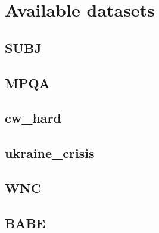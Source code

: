 \section{Available datasets}

\subsection{SUBJ}
\subsection{MPQA}
\subsection{cw\_hard}
\subsection{ukraine\_crisis}
\subsection{WNC}
\subsection{BABE}
